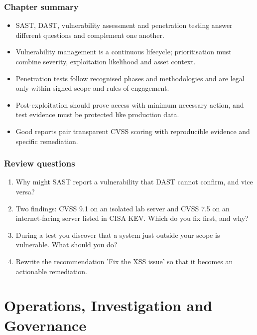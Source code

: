 \documentclass[11pt,openany]{book}
\begin{document}
\section*{Chapter summary}
\begin{itemize}
  \item SAST, DAST, vulnerability assessment and penetration testing answer different questions and complement one another.
  \item Vulnerability management is a continuous lifecycle; prioritisation must combine severity, exploitation likelihood and asset context.
  \item Penetration tests follow recognised phases and methodologies and are legal only within signed scope and rules of engagement.
  \item Post-exploitation should prove access with minimum necessary action, and test evidence must be protected like production data.
  \item Good reports pair transparent CVSS scoring with reproducible evidence and specific remediation.
\end{itemize}

\section*{Review questions}
\begin{enumerate}
  \item Why might SAST report a vulnerability that DAST cannot confirm, and vice versa?
  \item Two findings: CVSS 9.1 on an isolated lab server and CVSS 7.5 on an internet-facing server listed in CISA KEV. Which do you fix first, and why?
  \item During a test you discover that a system just outside your scope is vulnerable. What should you do?
  \item Rewrite the recommendation 'Fix the XSS issue' so that it becomes an actionable remediation.
\end{enumerate}

\part{Operations, Investigation and Governance}
\end{document}
